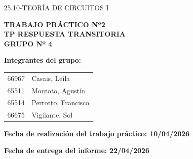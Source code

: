 25.10-TEORÍA DE CIRCUITOS I

\begin{center}
    
    {\large \textbf{TRABAJO PRÁCTICO Nº2}}\\[0.5cm]
    
    {\Large \textbf{TP RESPUESTA TRANSITORIA }}\\[1cm]
    
    {\normalsize \textbf{GRUPO Nº 4}}\\[0.5cm]

\end{center}

\vspace{0.5cm}

\textbf{Integrantes del grupo:}

\vspace{0.3cm}

\begin{tabular}{p{5cm} p{8cm}}
66967 & Casais, Leila \\
65511 & Montoto, Agustín \\
65514 & Perrotto, Francisco \\
66675 & Vigilante, Sol \\
\end{tabular}

\vspace{0.8cm}

\textbf{Fecha de realización del trabajo práctico: 10/04/2026} \\
\vspace{0.3cm}

\textbf{Fecha de entrega del informe: 22/04/2026}

\vspace{1cm}

\newpage